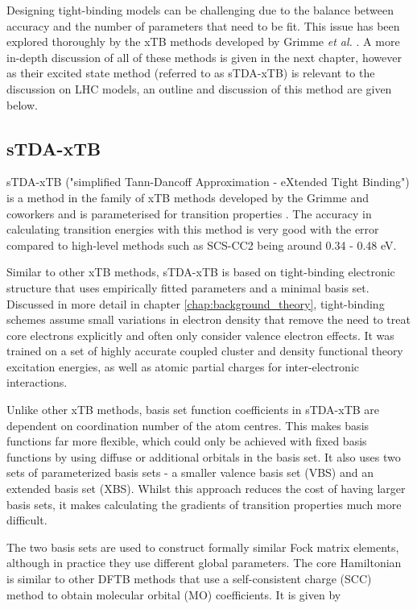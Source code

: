 Designing tight-binding models can be challenging due to the balance between accuracy
and the number of parameters that need to be fit. This issue has been explored thoroughly 
by the xTB methods developed by Grimme \emph{et al.} \cite{Bannwarth2020}. A more
in-depth discussion of all of these methods is given in the next chapter, however
as their excited state method (referred to as sTDA-xTB) is relevant to the discussion
on LHC models, an outline and discussion of this method are given below.

\subsection{sTDA-xTB}
\label{subsec:stda_xtb}
sTDA-xTB ("simplified Tann-Dancoff Approximation - eXtended Tight Binding") is a
method in the family of xTB methods developed by the Grimme and coworkers and is
parameterised for transition properties \cite{Grimme2016}. The accuracy in calculating
transition energies with this method is very good with the error compared to high-level 
methods such as SCS-CC2 being around 0.34 - 0.48 eV.

Similar to other xTB methods, sTDA-xTB is based on tight-binding electronic structure
that uses empirically fitted parameters and a minimal basis set. Discussed in more
detail in chapter \ref{chap:background_theory}, tight-binding schemes assume small
variations in electron density that remove the need to treat core electrons explicitly
and often only consider valence electron effects. It was trained on a set of highly
accurate coupled cluster and density functional theory excitation energies, as well
as atomic partial charges for inter-electronic interactions.

Unlike other xTB methods, basis set function coefficients in sTDA-xTB are dependent
on coordination number of the atom centres. This makes basis functions far more 
flexible, which could only be achieved with fixed basis functions by using diffuse
or additional orbitals in the basis set. It also uses two sets of parameterized 
basis sets - a smaller valence basis set (VBS) and an extended basis set (XBS).
Whilst this approach reduces the cost of having larger basis sets, it makes calculating
the gradients of transition properties much more difficult.

The two basis sets are used to construct formally similar Fock matrix elements,
although in practice they use different global parameters. The core Hamiltonian
is similar to other DFTB methods that use a self-consistent charge (SCC) method 
to obtain molecular orbital (MO) coefficients. It is given by

